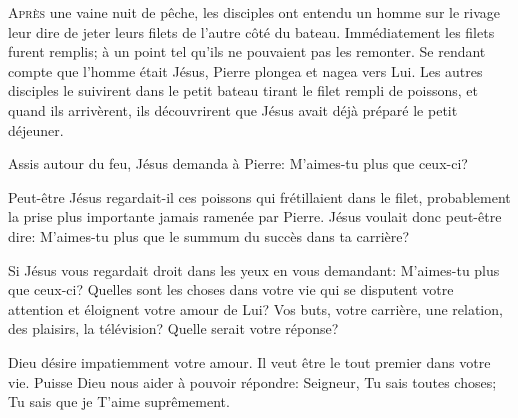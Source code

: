 



\lettrine{A}{près} une vaine nuit de pêche,
 les disciples ont entendu un homme sur le rivage
 leur dire de jeter leurs filets
 de l'autre côté du bateau. Immédiatement les filets furent remplis;
 à un point tel qu'ils ne pouvaient pas les remonter.
 Se rendant compte que l'homme était Jésus, Pierre plongea et nagea vers Lui.
 Les autres disciples le suivirent dans le petit bateau
 tirant le filet rempli de poissons, et quand ils arrivèrent,
 ils découvrirent que Jésus avait déjà préparé le petit déjeuner.

Assis autour du feu, Jésus demanda à Pierre: 
 \Og M'aimes-tu plus que ceux-ci? \Fg{}


Peut-être Jésus regardait-il ces poissons qui frétillaient dans le filet,
 probablement la prise plus importante jamais ramenée par Pierre.
 Jésus voulait donc peut-être dire: 
 \Og M'aimes-tu plus que le summum du succès dans ta carrière? \Fg{}

Si Jésus vous regardait droit dans les yeux en vous demandant:
 \Og M'aimes-tu plus que ceux-ci? \Fg{} 
 Quelles sont les choses dans votre vie qui se disputent votre attention
 et éloignent votre amour de Lui? Vos buts, votre carrière, une relation,
 des plaisirs, la télévision? Quelle serait votre réponse?

Dieu désire impatiemment votre amour. Il veut être le tout premier
 dans votre vie. Puisse Dieu nous aider à pouvoir répondre: 
 \Og Seigneur, Tu sais toutes choses; Tu sais que je T'aime suprêmement. \Fg{}

\dvrule




